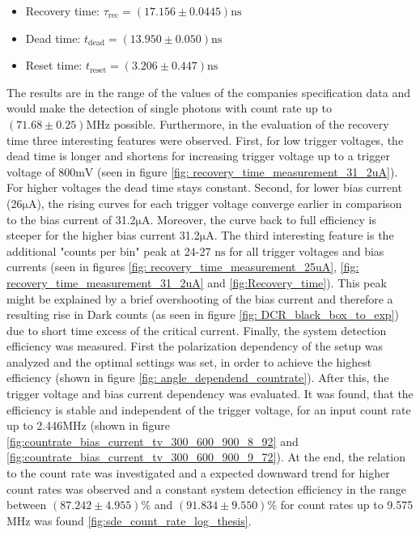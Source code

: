 \begin{itemize}
    \item Recovery time: $\tau_{\text{rec}} = (17.156 \pm 0.0445) \si{\nano \s}$
    \item Dead time: $t_{\text{dead}} =  (13.950 \pm 0.050) \si{\nano \s}$
    \item Reset time: $t_{\text{reset}} = (3.206 \pm 0.447) \si{\nano \s}$
\end{itemize}

The results are in the range of the values of the companies specification data \cite{tech_sheet_single_quantum} and would make the
detection of single photons with count rate up to  $(71.68 \pm 0.25)\si{\mega \Hz} $ possible.
Furthermore, in the evaluation of the recovery time three interesting features were observed.
First, for low trigger voltages, the dead time is longer and shortens for increasing trigger voltage up to a trigger voltage of
800$\si{\milli \V}$ (seen in figure \ref{fig: recovery_time_measurement_31_2uA}).
For higher voltages the dead time stays constant.
Second, for lower bias current (26$\si{\micro \A}$), the rising curves for each trigger voltage converge earlier in comparison
to the bias current of 31.2$\si{\micro \A}$.
Moreover, the curve back to full efficiency is steeper for the higher bias current 31.2$\si{\micro \A}$.
The third interesting feature is the additional "counts per bin" peak at 24-27 $\si{\nano \s}$ for all trigger voltages and
bias currents (seen in figures \ref{fig: recovery_time_measurement_25uA}, \ref{fig: recovery_time_measurement_31_2uA} and \ref{fig:Recovery_time}).
This peak might be explained by a brief overshooting of the bias current and therefore a resulting rise in Dark counts
(as seen in figure \ref{fig: DCR_black_box_to_exp}) due to short time excess of the critical current.
Finally, the system detection efficiency was measured.
First the polarization dependency of the setup was analyzed and the optimal settings was set, in order to achieve the highest efficiency (shown in figure \ref{fig: angle_dependend_countrate}).
After this, the trigger voltage and bias current dependency was evaluated.
It was found, that the efficiency is stable and independent of the trigger voltage, for an input count rate up to
2.446$\si{\mega \Hz}$ (shown in figure \ref{fig:countrate_bias_current_tv_300_600_900_8_92} and \ref{fig:countrate_bias_current_tv_300_600_900_9_72}).
At the end, the relation to the count rate was investigated and a expected downward trend for higher count rates was observed and
a constant system detection efficiency in the range between $(87.242 \pm 4.955) \%$ and $(91.834 \pm 9.550) \%$ for count rates up to
9.575 $\si{\mega \Hz}$ was found \ref{fig:sde_count_rate_log_thesis}. \\

